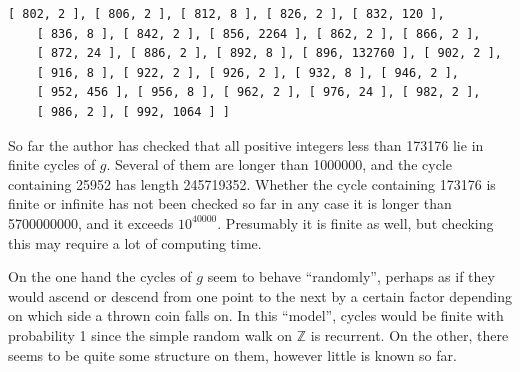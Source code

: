 \documentclass[a4paper,11pt]{report}
\begin{document}
{{\begin{Verbatim}[commandchars=!@|,fontsize=\small,frame=single,label=Example]
    [ 802, 2 ], [ 806, 2 ], [ 812, 8 ], [ 826, 2 ], [ 832, 120 ], 
    [ 836, 8 ], [ 842, 2 ], [ 856, 2264 ], [ 862, 2 ], [ 866, 2 ], 
    [ 872, 24 ], [ 886, 2 ], [ 892, 8 ], [ 896, 132760 ], [ 902, 2 ], 
    [ 916, 8 ], [ 922, 2 ], [ 926, 2 ], [ 932, 8 ], [ 946, 2 ], 
    [ 952, 456 ], [ 956, 8 ], [ 962, 2 ], [ 976, 24 ], [ 982, 2 ], 
    [ 986, 2 ], [ 992, 1064 ] ]
\end{Verbatim}
 So far the author has checked that all positive integers less than 173176 lie
in finite cycles of $g$. Several of them are longer than 1000000, and the cycle containing 25952 has
length 245719352. Whether the cycle containing 173176 is finite or infinite
has not been checked so far \texttt{}\texttt{} in any
case it is longer than 5700000000, and it exceeds $10^{40000}$. Presumably it is finite as well, but checking this may require a lot of
computing time. 

 On the one hand the cycles of $g$ seem to behave ``randomly'', perhaps as if they would ascend or descend from one point to the next by a
certain factor depending on which side a thrown coin falls on.
\texttt{}\texttt{} In this ``model'', cycles would be finite with probability 1 since the simple random walk on
{\ensuremath{\mathbb Z}} is recurrent. On the other, there seems to be quite
some structure on them, however little is known so far. 

}}
\end{document}
